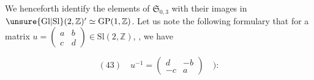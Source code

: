 We henceforth identify the elements of $\mathfrak S_{0,3}$ with their images in
$\unsure{\mathrm{Gl}|\mathrm{Sl}}(2,\mathbb Z)'\simeq\mathrm{GP}(1,\mathbb Z)$.
Let us note the following formulary  that for a matrix
$u=\begin{pmatrix}a&b\\c&d\end{pmatrix}\in\mathrm{Sl}(2,\mathbb Z)$,
, we have


\[
(43)\quad u^{-1}=\begin{pmatrix}d&-b\\-c&a\end{pmatrix}\quad):
\]


